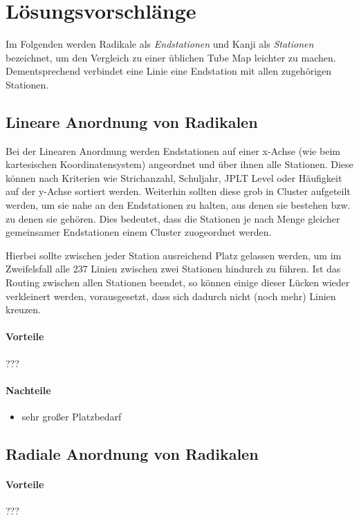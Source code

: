 \documentclass[color,german]{tudbook}
\begin{document}
\section{Lösungsvorschlänge}
Im Folgenden werden Radikale als \emph{Endstationen} und Kanji als \emph{Stationen} bezeichnet, um den Vergleich zu einer üblichen Tube Map leichter zu machen. Dementsprechend verbindet eine Linie eine Endstation mit allen zugehörigen Stationen.

\subsection{Lineare Anordnung von Radikalen}
Bei der Linearen Anordnung werden Endstationen auf einer x-Achse (wie beim kartesischen Koordinatensystem) angeordnet und über ihnen alle Stationen. Diese können nach Kriterien wie Strichanzahl, Schuljahr, JPLT Level oder Häufigkeit auf der y-Achse sortiert werden. Weiterhin sollten diese grob in Cluster aufgeteilt werden, um sie nahe an den Endstationen zu halten, aus denen sie bestehen bzw. zu denen sie gehören. Dies bedeutet, dass die Stationen je nach Menge gleicher gemeinsamer Endstationen einem Cluster zuogeordnet werden.

Hierbei sollte zwischen jeder Station ausreichend Platz gelassen werden, um im Zweifelsfall alle 237 Linien zwischen zwei Stationen hindurch zu führen. Ist das Routing zwischen allen Stationen beendet, so können einige dieser Lücken wieder verkleinert werden, vorausgesetzt, dass sich dadurch nicht (noch mehr) Linien kreuzen. 

\paragraph{Vorteile}
???

\paragraph{Nachteile}
\begin{itemize}
\item sehr großer Platzbedarf
\end{itemize}

\subsection{Radiale Anordnung von Radikalen}

\paragraph{Vorteile}
???
\end{document}
